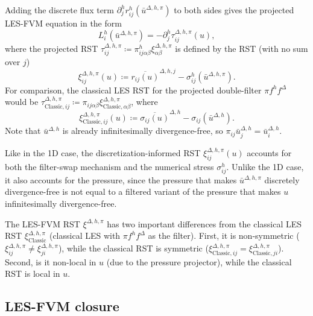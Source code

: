 \documentclass[preprint,twocolumn,5p]{elsarticle}
\begin{document}
Adding the discrete flux term
$\partial^h_j r^h_{i j}(\bar{u}^{\Delta, h, \pi})$
to both sides gives the projected LES-FVM
equation in the form
\begin{equation} \label{eq:ns-les-fvm}
    L^h_i(\bar{u}^{\Delta, h, \pi}) = - \partial^h_j \tau^{\Delta, h, \pi}_{i j}(u),
\end{equation}
where the projected RST
$\tau^{\Delta, h, \pi}_{i j} \coloneq \pi^h_{i j \alpha \beta} \xi^{\Delta, h, \pi}_{\alpha \beta}$
is defined by the RST (with no sum over $j$)
\begin{equation} \label{eq:ns-xi-Delta-h-pi}
    \boxed{
    \xi^{\Delta, h, \pi}_{i j}(u) \coloneq
    \overline{r_{i j}(u)}^{\Delta, h, j} -
    \sigma^h_{i j}(\bar{u}^{\Delta, h, \pi}).
    }
\end{equation}
For comparison, the classical LES RST
for the projected double-filter $\pi f^h f^\Delta$ would be
$\tau^{\Delta, h, \pi}_{\text{Classic}, i j} \coloneq
\pi_{i j \alpha \beta} \xi^{\Delta, h, \pi}_{\text{Classic}, \alpha \beta}$,
where
\begin{equation}
    \xi^{\Delta, h, \pi}_{\text{Classic}, i j}(u) \coloneq
    \overline{\sigma_{i j}(u)}^{\Delta, h} -
    \sigma_{i j}(\bar{u}^{\Delta, h}).
\end{equation}
Note that $\bar{u}^{\Delta, h}$ is already infinitesimally divergence-free, so
$\pi_{i j} \bar{u}^{\Delta, h}_j = \bar{u}^{\Delta, h}_i$.

Like in the 1D case,
the discretization-informed RST $\xi^{\Delta, h, \pi}_{i j}(u)$ accounts for
both the filter-swap mechanism and the numerical stress $\sigma^h_{i j}$.
Unlike the 1D case, it also accounts for the pressure, since
the pressure that makes $\bar{u}^{\Delta, h, \pi}$ discretely
divergence-free is not equal to a filtered variant of the pressure that makes
$u$ infinitesimally divergence-free.

The LES-FVM RST $\xi^{\Delta, h, \pi}$ has two important differences from
the classical LES RST $\xi^{\Delta, h, \pi}_\text{Classic}$
(classical LES with $\pi f^h f^\Delta$ as the filter).
First, it is non-symmetric
($\xi^{\Delta, h, \pi}_{i j} \neq \xi^{\Delta, h, \pi}_{j i}$),
while the classical RST is symmetric
($\xi^{\Delta, h, \pi}_{\text{Classic}, i j} = \xi^{\Delta, h, \pi}_{\text{Classic}, j i}$).
Second, is it non-local in $u$ (due to the pressure projector),
while the classical RST is local in $u$.

\subsection{LES-FVM closure}
\end{document}

